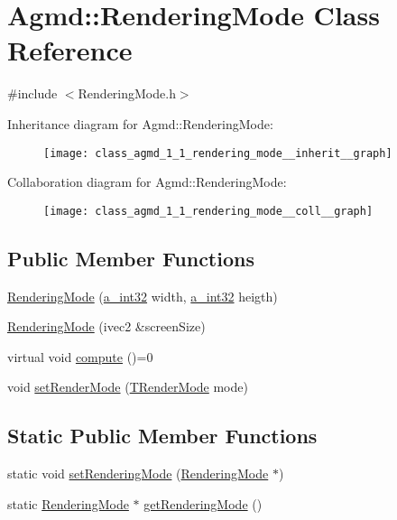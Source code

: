 \hypertarget{class_agmd_1_1_rendering_mode}{\section{Agmd\+:\+:Rendering\+Mode Class Reference}
\label{class_agmd_1_1_rendering_mode}
}


{\ttfamily \#include $<$Rendering\+Mode.\+h$>$}



Inheritance diagram for Agmd\+:\+:Rendering\+Mode\+:\nopagebreak
\begin{figure}[H]
\begin{center}
\leavevmode
\texttt{[image: class\_agmd\_1\_1\_rendering\_mode\_\_inherit\_\_graph]}
\end{center}
\end{figure}


Collaboration diagram for Agmd\+:\+:Rendering\+Mode\+:\nopagebreak
\begin{figure}[H]
\begin{center}
\leavevmode
\texttt{[image: class\_agmd\_1\_1\_rendering\_mode\_\_coll\_\_graph]}
\end{center}
\end{figure}
\subsection*{Public Member Functions}
\begin{DoxyCompactItemize}
\item 
\hyperlink{class_agmd_1_1_rendering_mode_af13f0a62f876c1a08ae0490cea246869}{Rendering\+Mode} (\hyperlink{_common_defines_8h_ae2e4316e0b924774484a728669bebc9b}{a\+\_\+int32} width, \hyperlink{_common_defines_8h_ae2e4316e0b924774484a728669bebc9b}{a\+\_\+int32} heigth)
\item 
\hyperlink{class_agmd_1_1_rendering_mode_a553cfd81c1ef6caddcb8859e56b0a1eb}{Rendering\+Mode} (ivec2 \&screen\+Size)
\item 
virtual void \hyperlink{class_agmd_1_1_rendering_mode_a6a558c71d87ba840745d347832c2c77c}{compute} ()=0
\item 
void \hyperlink{class_agmd_1_1_rendering_mode_a841947427249a9762ce7d57f9a3f9c9f}{set\+Render\+Mode} (\hyperlink{namespace_agmd_aa4cbd15e55e815e187c31a8f435addae}{T\+Render\+Mode} mode)
\end{DoxyCompactItemize}
\subsection*{Static Public Member Functions}
\begin{DoxyCompactItemize}
\item 
static void \hyperlink{class_agmd_1_1_rendering_mode_a5f40f8fb26c586a54f5dd97bedda478e}{set\+Rendering\+Mode} (\hyperlink{class_agmd_1_1_rendering_mode}{Rendering\+Mode} $\ast$)
\item 
static \hyperlink{class_agmd_1_1_rendering_mode}{Rendering\+Mode} $\ast$ \hyperlink{class_agmd_1_1_rendering_mode_a7f71cb957d3b5f86419d2dd89f31f0d7}{get\+Rendering\+Mode} ()
\end{DoxyCompactItemize}
